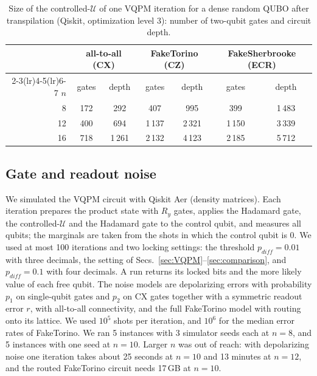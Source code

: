 \documentclass[onecolumn,10pt]{article}
\theoremstyle{remark}
\theoremstyle{plain}
\begin{document}
\begin{table}[ht]
\centering
\small
\setlength{\tabcolsep}{5pt}
\caption{Size of the controlled-$\mathcal U$ of one VQPM iteration for a dense random QUBO after transpilation (Qiskit, optimization level 3): number of two-qubit gates and circuit depth.}
\label{tab:gates}
\begin{tabular}{r cc cc cc}
\toprule
 & \multicolumn{2}{c}{all-to-all (CX)} & \multicolumn{2}{c}{FakeTorino (CZ)} & \multicolumn{2}{c}{FakeSherbrooke (ECR)} \\
\cmidrule(lr){2-3}\cmidrule(lr){4-5}\cmidrule(lr){6-7}
$n$ & gates & depth & gates & depth & gates & depth \\
\midrule
8 & 172 & 292 & 407 & 995 & 399 & 1\,483 \\
12 & 400 & 694 & 1\,137 & 2\,321 & 1\,150 & 3\,339 \\
16 & 718 & 1\,261 & 2\,132 & 4\,123 & 2\,185 & 5\,712 \\
\bottomrule
\end{tabular}
\end{table}

\subsection{Gate and readout noise}
\label{sec:gatenoise}
We simulated the VQPM circuit with Qiskit Aer (density matrices). Each iteration prepares the product state with $R_y$ gates, applies the Hadamard gate, the controlled-$\mathcal U$ and the Hadamard gate to the control qubit, and measures all qubits; the marginals are taken from the shots in which the control qubit is $0$. We used at most 100 iterations and two locking settings: the threshold $p_{diff}=0.01$ with three decimals, the setting of Secs.~\ref{sec:VQPM}--\ref{sec:comparison}, and $p_{diff}=0.1$ with four decimals. A run returns its locked bits and the more likely value of each free qubit. The noise models are depolarizing errors with probability $p_1$ on single-qubit gates and $p_2$ on CX gates together with a symmetric readout error $r$, with all-to-all connectivity, and the full FakeTorino model with routing onto its lattice. We used $10^5$ shots per iteration, and $10^6$ for the median error rates of FakeTorino. We ran 5 instances with 3 simulator seeds each at $n=8$, and 5 instances with one seed at $n=10$. Larger $n$ was out of reach: with depolarizing noise one iteration takes about 25 seconds at $n=10$ and 13 minutes at $n=12$, and the routed FakeTorino circuit needs 17\,GB at $n=10$.
\end{document}
